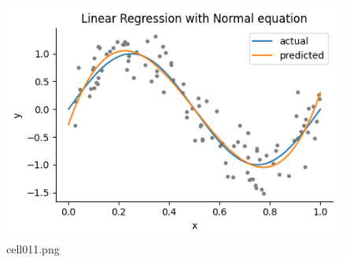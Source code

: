 \begin{figure}[ht]
	\centering
	\includegraphics[scale=0.8, max width=\linewidth]{./fig/introduction/linear-regression/cell011.png}
	\caption{cell011.png}
	\label{cell011.png}
\end{figure}